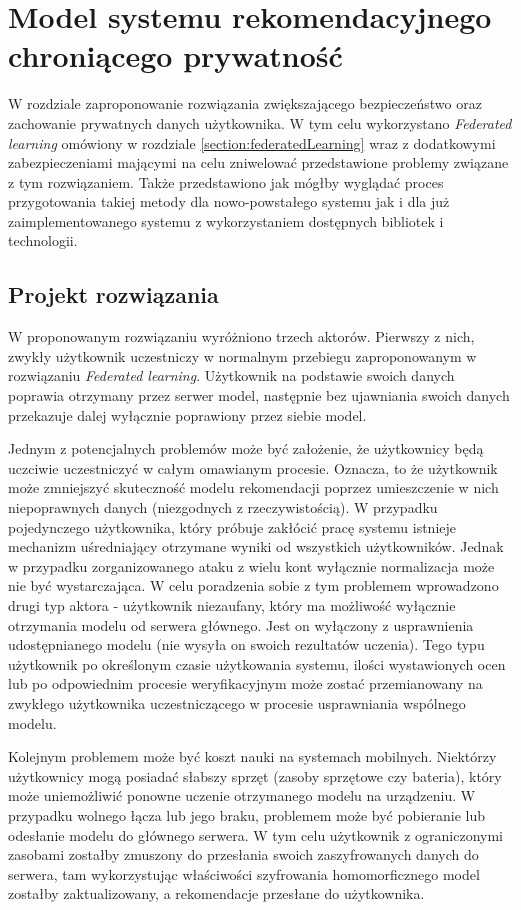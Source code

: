 
\chapter{Model systemu rekomendacyjnego chroniącego prywatność}

W rozdziale zaproponowanie rozwiązania zwiększającego bezpieczeństwo oraz zachowanie prywatnych danych użytkownika. W tym celu wykorzystano \textit{Federated learning} omówiony w rozdziale \ref{section:federatedLearning} wraz z dodatkowymi zabezpieczeniami mającymi na celu zniwelować przedstawione problemy związane z tym rozwiązaniem. Także przedstawiono jak mógłby wyglądać proces przygotowania takiej metody dla nowo-powstałego systemu jak i dla już zaimplementowanego systemu z wykorzystaniem dostępnych bibliotek i technologii.

\section{Projekt rozwiązania}

W proponowanym rozwiązaniu wyróżniono trzech aktorów. Pierwszy z nich, zwykły użytkownik uczestniczy w normalnym przebiegu zaproponowanym w rozwiązaniu \textit{Federated learning}. Użytkownik na podstawie swoich danych poprawia otrzymany przez serwer model, następnie bez ujawniania swoich danych przekazuje dalej wyłącznie poprawiony przez siebie model.

Jednym z potencjalnych problemów może być założenie, że użytkownicy będą uczciwie uczestniczyć w całym omawianym procesie. Oznacza, to że użytkownik może zmniejszyć skuteczność modelu rekomendacji poprzez umieszczenie w nich niepoprawnych danych (niezgodnych z rzeczywistością). W przypadku pojedynczego użytkownika, który próbuje zakłócić pracę systemu istnieje mechanizm uśredniający otrzymane wyniki od wszystkich użytkowników. Jednak w przypadku zorganizowanego ataku z wielu kont wyłącznie normalizacja może nie być wystarczająca. W celu poradzenia sobie z tym problemem wprowadzono drugi typ aktora - użytkownik niezaufany, który ma możliwość wyłącznie otrzymania modelu od serwera głównego. Jest on wyłączony z usprawnienia udostępnianego modelu (nie wysyła on swoich rezultatów uczenia). Tego typu użytkownik po określonym czasie użytkowania systemu, ilości wystawionych ocen lub po odpowiednim procesie weryfikacyjnym może zostać przemianowany na zwykłego użytkownika uczestniczącego w procesie usprawniania wspólnego modelu.

Kolejnym problemem może być koszt nauki na systemach mobilnych. Niektórzy użytkownicy mogą posiadać słabszy sprzęt (zasoby sprzętowe czy bateria), który może uniemożliwić ponowne uczenie otrzymanego modelu na urządzeniu. W przypadku wolnego łącza lub jego braku, problemem może być pobieranie lub odesłanie modelu do głównego serwera. W tym celu użytkownik z ograniczonymi zasobami zostałby zmuszony do przesłania swoich zaszyfrowanych danych do serwera, tam wykorzystując właściwości szyfrowania homomorficznego model zostałby zaktualizowany, a rekomendacje przesłane do użytkownika.

